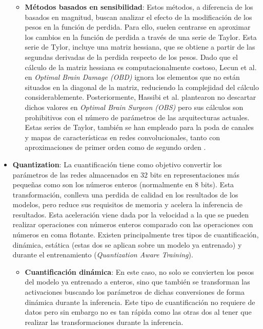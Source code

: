 \begin{itemize}
\begin{itemize}
        \item \textbf{Métodos basados en sensibilidad}: Estos métodos, a diferencia de los basados en magnitud, buscan analizar el efecto de la modificación de los pesos en la función de perdida. Para ello, suelen centrarse en aproximar los cambios en la función de perdida a través de una serie de Taylor. Esta serie de Tylor, incluye una matriz hessiana, que se obtiene a partir de las segundas derivadas de la perdida respecto de los pesos. 
        Dado que el cálculo de la matriz hessiana es computacionalmente costoso, Lecun et al. en \textit{Optimal Brain Damage (OBD)} \cite{NIPS1989_6c9882bb} ignora los elementos que no están situados en la diagonal de la matriz, reduciendo la complejidad del cálculo considerablemente. Posteriormente, Hassibi et al. plantearon no descartar dichos valores en \textit{Optimal Brain Surgeon (OBS)} \cite{NIPS1993_b056eb15} pero sus cálculos son prohibitivos con el número de parámetros de las arquitecturas actuales. Estas series de Taylor, también se han empleado para la poda de canales y mapas de características en redes convolucionales, tanto con aproximaciones de primer orden \cite{molchanov2017pruning} como de segundo orden \cite{pmlr-v97-wang19g}. 
    \end{itemize}
    \item \textbf{Quantization}: La cuantificación tiene como objetivo convertir los parámetros de las redes almacenados en 32 bits en representaciones más pequeñas como son los números enteros (normalmente en 8 bits). Esta transformación, conlleva una perdida de calidad en los resultados de los modelos, pero reduce sus requisitos de memoria y acelera la inferencia de resultados. Esta aceleración viene dada por la velocidad a la que se pueden realizar operaciones con números enteros comparado con las operaciones con números en coma flotante. Existen principalmente tres tipos de cuantificación, dinámica, estática (estas dos se aplican sobre un modelo ya entrenado) y durante el entrenamiento (\textit{Quantization Aware Training}).
    \begin{itemize}
        \item \textbf{Cuantificación dinámica}: En este caso, no solo se convierten los pesos del modelo ya entrenado a enteros, sino que también se transforman las activaciones buscando los parámetros de dichas conversiones de forma dinámica durante la inferencia. Este tipo de cuantificación no requiere de datos pero sin embargo no es tan rápida como las otras dos al tener que realizar las transformaciones durante la inferencia.

\end{itemize}
\end{itemize}
